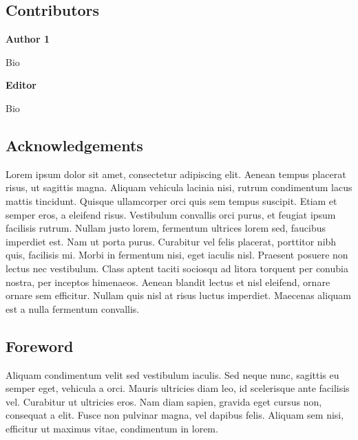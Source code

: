 \documentclass{article}
\begin{document}
\subsection{Contributors}\label{H344358}



\textbf{Author 1}

Bio


\textbf{Editor}

Bio


\subsection{Acknowledgements}\label{H3962672}



Lorem ipsum dolor sit amet, consectetur adipiscing elit. Aenean tempus placerat risus, ut sagittis magna. Aliquam vehicula lacinia nisi, rutrum condimentum lacus mattis tincidunt. Quisque ullamcorper orci quis sem tempus suscipit. Etiam et semper eros, a eleifend risus. Vestibulum convallis orci purus, et feugiat ipsum facilisis rutrum. Nullam justo lorem, fermentum ultrices lorem sed, faucibus imperdiet est. Nam ut porta purus. Curabitur vel felis placerat, porttitor nibh quis, facilisis mi. Morbi in fermentum nisi, eget iaculis nisl. Praesent posuere non lectus nec vestibulum. Class aptent taciti sociosqu ad litora torquent per conubia nostra, per inceptos himenaeos. Aenean blandit lectus et nisl eleifend, ornare ornare sem efficitur. Nullam quis nisl at risus luctus imperdiet. Maecenas aliquam est a nulla fermentum convallis.


\subsection{Foreword}\label{H4408518}



Aliquam condimentum velit sed vestibulum iaculis. Sed neque nunc, sagittis eu semper eget, vehicula a orci. Mauris ultricies diam leo, id scelerisque ante facilisis vel. Curabitur ut ultricies eros. Nam diam sapien, gravida eget cursus non, consequat a elit. Fusce non pulvinar magna, vel dapibus felis. Aliquam sem nisi, efficitur ut maximus vitae, condimentum in lorem.
\end{document}
